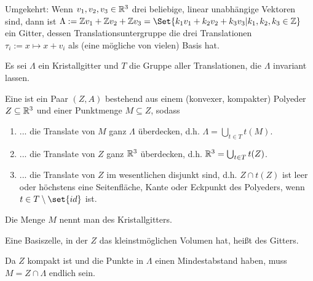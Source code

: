 \documentclass[fontsize=11pt,fleqn,a4paper]{scrartcl}
\begin{document}
\begin{example}
Umgekehrt: Wenn $v_1,v_2,v_3\in\mathbb{R}^3$ drei beliebige, linear unabhängige Vektoren sind, dann ist $\Lambda:=\IZ v_1+\IZ v_2 + \IZ v_3 = \Set{k_1 v_1+k_2 v_2+k_3 v_3 | k_1,k_2,k_3\in\IZ}$ ein Gitter, dessen Translationsuntergruppe die drei Translationen $\tau_i:=x\mapsto x+v_i$ als (eine mögliche von vielen) Basis hat.
\end{example}

\begin{definition}
Es sei $\Lambda$ ein Kristallgitter und $T$ die Gruppe aller Translationen, die $\Lambda$ invariant lassen.

Eine  ist ein Paar $(Z,A)$ bestehend aus einem (konvexer, kompakter) Polyeder $Z\subseteq\mathbb{R}^3$ und einer Punktmenge $M\subseteq Z$, sodass
\begin{enumerate}
\item ... die Translate von $M$ ganz $\Lambda$ überdecken, d.h. $\Lambda=\bigcup_{t\in T} t(M)$.
\item ... die Translate von $Z$ ganz $\mathbb{R}^3$ überdecken, d.h. $\mathbb{R}^3 = \bigcup_{t\in T} t(Z)$.
\item ... die Translate von $Z$ im wesentlichen disjunkt sind, d.h. $Z \cap t(Z)$ ist leer oder höchstens eine Seitenfläche, Kante oder Eckpunkt des Polyeders, wenn $t\in T\setminus\set{id}$ ist.
\end{enumerate}
Die Menge $M$ nennt man  des Kristallgitters.

Eine Basiszelle, in der $Z$ das kleinstmöglichen Volumen hat, heißt  des Gitters.
\end{definition}

\begin{remark}
Da $Z$ kompakt ist und die Punkte in $\Lambda$ einen Mindestabstand haben, muss $M=Z\cap\Lambda$ endlich sein.
\end{remark}

\begin{theorem}
\end{theorem}
\end{document}

